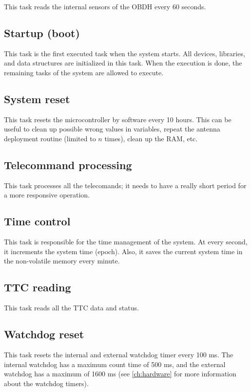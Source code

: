 This task reads the internal sensors of the OBDH every 60 seconds.

\subsection{Startup (boot)}

This task is the first executed task when the system starts. All devices, libraries, and data structures are initialized in this task. When the execution is done, the remaining tasks of the system are allowed to execute.

\subsection{System reset}

This task resets the microcontroller by software every 10 hours. This can be useful to clean up possible wrong values in variables, repeat the antenna deployment routine (limited to $n$ times), clean up the RAM, etc.

\subsection{Telecommand processing}

This task processes all the telecomands; it needs to have a really short period for a more responsive operation.

\subsection{Time control}

This task is responsible for the time management of the system. At every second, it increments the system time (epoch). Also, it saves the current system time in the non-volatile memory every minute.

\subsection{TTC reading}

This task reads all the TTC data and status.

\subsection{Watchdog reset}

This task resets the internal and external watchdog timer every 100 ms. The internal watchdog has a maximum count time of 500 ms, and the external watchdog has a maximum of 1600 ms (see \autoref{ch:hardware} for more information about the watchdog timers).

